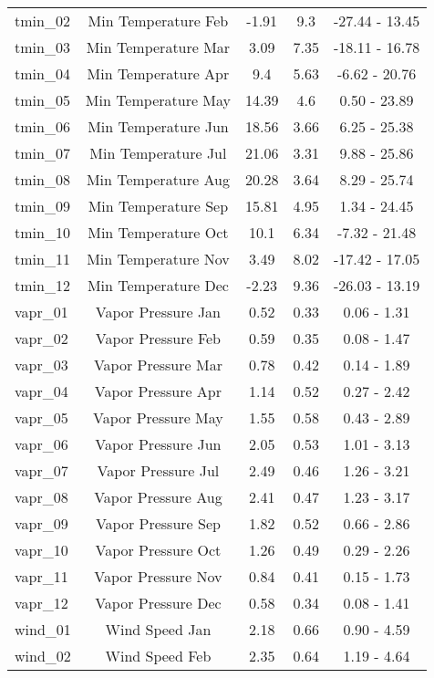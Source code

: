 \begin{table}[H]
\begin{tabular}{lcccc}
			tmin\_02 & Min Temperature Feb & -1.91 & 9.3 & -27.44 - 13.45 \\
			tmin\_03 & Min Temperature Mar & 3.09 & 7.35 & -18.11 - 16.78 \\
			tmin\_04 & Min Temperature Apr & 9.4 & 5.63 & -6.62 - 20.76 \\
			tmin\_05 & Min Temperature May & 14.39 & 4.6 & 0.50 - 23.89 \\
			tmin\_06 & Min Temperature Jun & 18.56 & 3.66 & 6.25 - 25.38 \\
			tmin\_07 & Min Temperature Jul & 21.06 & 3.31 & 9.88 - 25.86 \\
			tmin\_08 & Min Temperature Aug & 20.28 & 3.64 & 8.29 - 25.74 \\
			tmin\_09 & Min Temperature Sep & 15.81 & 4.95 & 1.34 - 24.45 \\
			tmin\_10 & Min Temperature Oct & 10.1 & 6.34 & -7.32 - 21.48 \\
			tmin\_11 & Min Temperature Nov & 3.49 & 8.02 & -17.42 - 17.05 \\
			tmin\_12 & Min Temperature Dec & -2.23 & 9.36 & -26.03 - 13.19 \\
			vapr\_01 & Vapor Pressure Jan & 0.52 & 0.33 & 0.06 - 1.31 \\
			vapr\_02 & Vapor Pressure Feb & 0.59 & 0.35 & 0.08 - 1.47 \\
			vapr\_03 & Vapor Pressure Mar & 0.78 & 0.42 & 0.14 - 1.89 \\
			vapr\_04 & Vapor Pressure Apr & 1.14 & 0.52 & 0.27 - 2.42 \\
			vapr\_05 & Vapor Pressure May & 1.55 & 0.58 & 0.43 - 2.89 \\
			vapr\_06 & Vapor Pressure Jun & 2.05 & 0.53 & 1.01 - 3.13 \\
			vapr\_07 & Vapor Pressure Jul & 2.49 & 0.46 & 1.26 - 3.21 \\
			vapr\_08 & Vapor Pressure Aug & 2.41 & 0.47 & 1.23 - 3.17 \\
			vapr\_09 & Vapor Pressure Sep & 1.82 & 0.52 & 0.66 - 2.86 \\
			vapr\_10 & Vapor Pressure Oct & 1.26 & 0.49 & 0.29 - 2.26 \\
			vapr\_11 & Vapor Pressure Nov & 0.84 & 0.41 & 0.15 - 1.73 \\
			vapr\_12 & Vapor Pressure Dec & 0.58 & 0.34 & 0.08 - 1.41 \\
			wind\_01 & Wind Speed Jan & 2.18 & 0.66 & 0.90 - 4.59 \\
			wind\_02 & Wind Speed Feb & 2.35 & 0.64 & 1.19 - 4.64 \\

\end{tabular}
\end{table}
